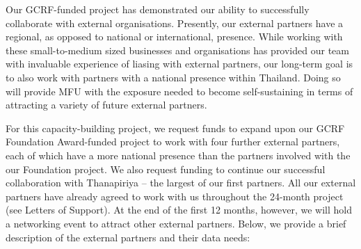 \documentclass[11pt]{article}
\begin{document}
  \vspace{2mm}
  \noindent
  Our GCRF-funded project has demonstrated our ability to successfully collaborate with external organisations. Presently, our external partners have a regional, as opposed to national or international, presence. While working with these small-to-medium sized businesses and organisations has provided our team with invaluable experience of liasing with external partners, our long-term goal is to also work with partners with a national presence within Thailand. Doing so will provide MFU with the exposure needed to become self-sustaining in terms of attracting a variety of future external partners.

  \vspace{2mm}
  \noindent
  For this capacity-building project, we request funds to expand upon our GCRF Foundation Award-funded project to work with four further external partners, each of which have a more national presence than the partners involved with the our Foundation project. We also request funding to continue our successful collaboration with Thanapiriya -- the largest of our first partners. All our external partners have already agreed to work with us throughout the 24-month project (see Letters of Support). At the end of the first 12 months, however, we will hold a networking event to attract other external partners. Below, we provide a brief description of the external partners and their data needs:
  
\end{document}

